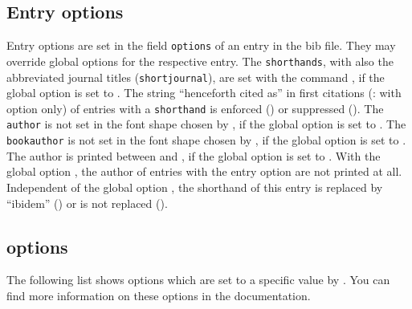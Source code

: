 \documentclass[english]{scrartcl}
\begin{document}
\subsection{Entry options}
Entry options are set in the field \texttt{options} of an entry in the bib file. 
They may override global options for the respective entry.
	  The \texttt{shorthands}, with  also the abbreviated
	  journal titles (\texttt{shortjournal}), are set with the command ,
	  if the global option  is set to .
	  The string \enquote{henceforth cited as} in first citations 
	  (: with option  only) of entries 
	  with a \texttt{shorthand} is enforced () or suppressed 
	  ().
	  The \texttt{author} is not set in the font shape chosen by ,
	  if the global option  is set to .
	  The \texttt{bookauthor} is not set in the font shape chosen by ,
	  if the global option  is set to .
	  The author is printed between  and ,
	  if the global option  is set to . With the
		global option , the author of entries with the
		entry option  are not printed at all.
	  Independent of the global option , the shorthand of 
	  this entry is replaced by \enquote{ibidem} () or is not 
	  replaced ().

\subsection{\texorpdfstring{\bl}{biblatex} options}
The following list shows \bl{} options which are set to a specific value by \bldw{}. You can find more information on these options in the \bl{} documentation.
\end{document}
